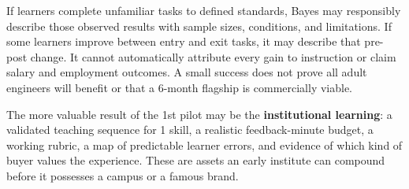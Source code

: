 If learners complete unfamiliar tasks to defined standards, Bayes may responsibly describe those observed results with sample sizes, conditions, and limitations. If some learners improve between entry and exit tasks, it may describe that pre-post change. It cannot automatically attribute every gain to instruction or claim salary and employment outcomes. A small success does not prove all adult engineers will benefit or that a 6-month flagship is commercially viable.

The more valuable result of the 1st pilot may be the \textbf{institutional learning}: a validated teaching sequence for 1 skill, a realistic feedback-minute budget, a working rubric, a map of predictable learner errors, and evidence of which kind of buyer values the experience. These are assets an early institute can compound before it possesses a campus or a famous brand.
